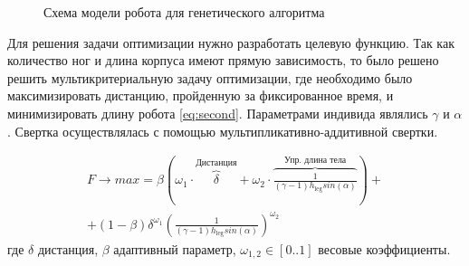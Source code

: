 \begin{figure}[H]
    \centering
    \caption{Схема модели робота для генетического алгоритма}
    \label{fig:best_gen_robot.jpg}
\end{figure}

Для решения задачи оптимизации нужно разработать целевую функцию. Так как количество ног и длина корпуса имеют прямую зависимость, то было решено решить мультикритериальную задачу оптимизации, где необходимо было максимизировать дистанцию, пройденную за фиксированное время, и минимизировать длину робота \eqref{eq:second}. Параметрами индивида являлись $\gamma$ и $\alpha$. Свертка осуществлялась с помощью мультипликативно-аддитивной свертки.

\begin{eqnarray}
    \label{eq:second}
    F \rightarrow max = \beta \left( {\omega}_{1} \cdot \overbrace{\delta}^{\text{Дистанция}} + {\omega}_{2} \cdot \overbrace{\frac{1}{(\gamma - 1) h_{\text{leg}}sin(\alpha)}}^{\text{Упр. длина тела}}\right) + \\ \nonumber + (1 - \beta) {\delta}^{{\omega}_{1}} {\left( \frac{1}{(\gamma - 1)h_{\text{leg}}sin(\alpha)}\right)}^{{\omega}_{2}}
\end{eqnarray}
где $\delta$ дистанция, $\beta$ адаптивный параметр, ${\omega}_{1,2} \in  [ 0..1 ] $ весовые коэффициенты.


